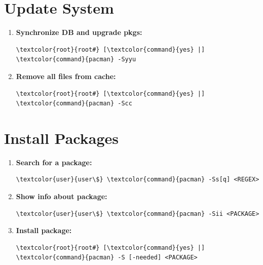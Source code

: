\documentclass[10pt, a4paper, onecolumn, oneside, titlepage, openany]{book}
\begin{document}
\section{Update System}
\begin{enumerate}
    \item \textbf{Synchronize DB and upgrade pkgs:}
\begin{Verbatim}[commandchars=\\\{\}]
\textcolor{root}{root#} [\textcolor{command}{yes} |] \textcolor{command}{pacman} -Syyu
\end{Verbatim}
    \item \textbf{Remove all files from cache:}
\begin{Verbatim}[commandchars=\\\{\}]
\textcolor{root}{root#} [\textcolor{command}{yes} |] \textcolor{command}{pacman} -Scc
\end{Verbatim}
\end{enumerate}

\section{Install Packages}
\begin{enumerate}
    \item \textbf{Search for a package:}
\begin{Verbatim}[commandchars=\\\{\}]
\textcolor{user}{user\$} \textcolor{command}{pacman} -Ss[q] <REGEX>
\end{Verbatim}
    \item \textbf{Show info about package:}
\begin{Verbatim}[commandchars=\\\{\}]
\textcolor{user}{user\$} \textcolor{command}{pacman} -Sii <PACKAGE>
\end{Verbatim}
    \item \textbf{Install package:}
\begin{Verbatim}[commandchars=\\\{\}]
\textcolor{root}{root#} [\textcolor{command}{yes} |] \textcolor{command}{pacman} -S [-needed] <PACKAGE>
\end{Verbatim}
\end{enumerate}
\end{document}

